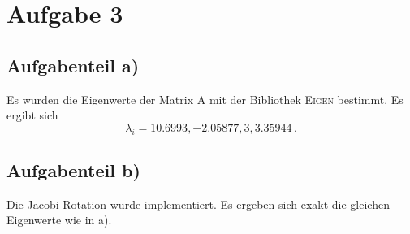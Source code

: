 \section*{Aufgabe 3}
\subsection*{Aufgabenteil a)}
Es wurden die Eigenwerte der Matrix A mit der Bibliothek \textsc{Eigen} bestimmt.
Es ergibt sich
\begin{equation}
  \lambda_i = 10.6993, -2.05877, 3, 3.35944 \, .
\end{equation}
\subsection*{Aufgabenteil b)}
Die Jacobi-Rotation wurde implementiert. Es ergeben sich exakt die gleichen
Eigenwerte wie in a).
